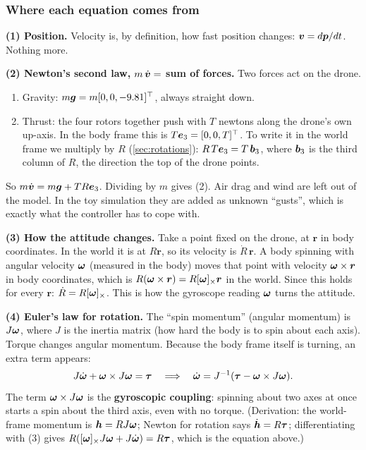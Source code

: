 \subsubsection*{Where each equation comes from}

\textbf{(1) Position.} Velocity is, by definition, how fast position changes: $\bm{v}=d\bm{p}/dt$. Nothing more.

\textbf{(2) Newton's second law, $m\,\dot{\bm{v}}=$ sum of forces.} Two forces act on the drone.
\begin{enumerate}
  \item Gravity: $m\bm{g}=m[0,0,-9.81]^\top$, always straight down.
  \item Thrust: the four rotors together push with $T$ newtons along the drone's own up-axis. In the body frame this
        is $T\bm{e}_3=[0,0,T]^\top$. To write it in the world frame we multiply by $R$ (\cref{sec:rotations}):
        $R\,T\bm{e}_3=T\,\bm{b}_3$, where $\bm{b}_3$ is the third column of $R$, the direction the top of the drone points.
\end{enumerate}
So $m\dot{\bm{v}}=m\bm{g}+T R\bm{e}_3$. Dividing by $m$ gives (2). Air drag and wind are left out of the model. In the toy
simulation they are added as unknown ``gusts'', which is exactly what the controller has to cope with.

\textbf{(3) How the attitude changes.} Take a point fixed on the drone, at $\bm r$ in body coordinates. In the world
it is at $R\bm r$, so its velocity is $\dot R\,\bm r$. A body spinning with angular velocity $\bm{\omega}$ (measured in the body)
moves that point with velocity $\bm{\omega}\times\bm r$ in body coordinates, which is $R(\bm{\omega}\times\bm r)=R[\bm{\omega}]_{\times}\bm r$ in
the world. Since this holds for every $\bm r$: $\dot R=R[\bm{\omega}]_{\times}$. This is how the gyroscope reading $\bm{\omega}$ turns the
attitude.

\textbf{(4) Euler's law for rotation.} The ``spin momentum'' (angular momentum) is $J\bm{\omega}$, where $J$ is the
inertia matrix (how hard the body is to spin about each axis). Torque changes angular momentum. Because the body
frame itself is turning, an extra term appears:
\[
J\dot{\bm{\omega}}+\bm{\omega}\times J\bm{\omega}=\bm{\tau}\quad\Longrightarrow\quad \dot{\bm{\omega}}=J^{-1}(\bm{\tau}-\bm{\omega}\times J\bm{\omega}).
\]
The term $\bm{\omega}\times J\bm{\omega}$ is the \textbf{gyroscopic coupling}: spinning about two axes at once starts a spin about the
third axis, even with no torque. (Derivation: the world-frame momentum is $\bm h=RJ\bm{\omega}$; Newton for rotation says
$\dot{\bm h}=R\bm{\tau}$; differentiating with (3) gives $R([\bm{\omega}]_{\times}J\bm{\omega}+J\dot{\bm{\omega}})=R\bm{\tau}$, which is the equation above.)

